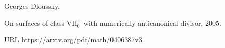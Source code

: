 Georges Dloussky.

\newblock On surfaces of class {VII}$_0^+$ with numerically anticanonical
  divisor, 2005.

\newblock URL \url{https://arxiv.org/pdf/math/0406387v3}.

